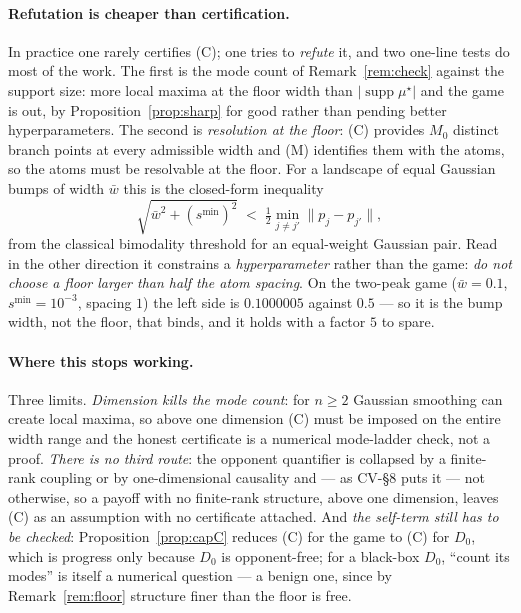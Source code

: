 \documentclass[11pt]{article}
\theoremstyle{definition}
\DeclareMathOperator{\supp}{supp}
\newcommand{\CV}[1]{\textsf{CV-#1}}
\begin{document}
\paragraph{Refutation is cheaper than certification.} In practice one rarely
certifies (C); one tries to \emph{refute} it, and two one-line tests do most of
the work. The first is the mode count of Remark~\ref{rem:check} against the
support size: more local maxima at the floor width than $|\supp\mu^\star|$ and the
game is out, by Proposition~\ref{prop:sharp} for good rather than pending better
hyperparameters. The second is \emph{resolution at the floor}: (C) provides $M_0$
distinct branch points at every admissible width and (M) identifies them with the
atoms, so the atoms must be resolvable at the floor. For a landscape of equal
Gaussian bumps of width $\bar w$ this is the closed-form inequality
\begin{equation}\label{eq:resolution}
  \sqrt{\bar w^2 + (s^{\min})^2} \;<\; \tfrac12 \min_{j\ne j'}\|p_j - p_{j'}\| ,
\end{equation}
from the classical bimodality threshold for an equal-weight Gaussian pair. Read in
the other direction it constrains a \emph{hyperparameter} rather than the game:
\emph{do not choose a floor larger than half the atom spacing}. On the two-peak
game ($\bar w = 0.1$, $s^{\min} = 10^{-3}$, spacing $1$) the left side is
$0.1000005$ against $0.5$ --- so it is the bump width, not the floor, that binds,
and it holds with a factor $5$ to spare.

\paragraph{Where this stops working.} Three limits. \emph{Dimension kills the mode
count}: for $n \ge 2$ Gaussian smoothing can create local maxima, so above one
dimension (C) must be imposed on the entire width range and the honest certificate
is a numerical mode-ladder check, not a proof. \emph{There is no third route}: the
opponent quantifier is collapsed by a finite-rank coupling or by one-dimensional
causality and --- as \CV{\S8} puts it --- not otherwise, so a payoff with no
finite-rank structure, above one dimension, leaves (C) as an assumption with no
certificate attached. And \emph{the self-term still has to be checked}:
Proposition~\ref{prop:capC} reduces (C) for the game to (C) for $D_0$, which is
progress only because $D_0$ is opponent-free; for a black-box $D_0$, ``count its
modes'' is itself a numerical question --- a benign one, since by
Remark~\ref{rem:floor} structure finer than the floor is free.
\end{document}

